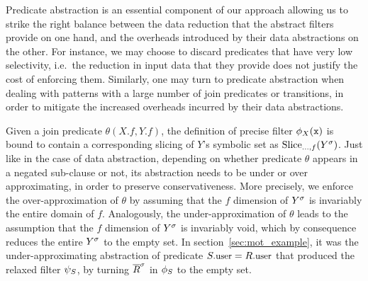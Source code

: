 Predicate abstraction is an essential component of our approach
allowing us to strike the right balance between the data reduction that the
abstract filters provide on one hand, and the overheads introduced by their
data abstractions on the other.
For instance, we may choose to discard
predicates that have very low selectivity, i.e.\ the reduction in input 
data
that they provide does not justify the cost of enforcing them.
Similarly, one may turn to predicate abstraction when dealing with patterns
 with
a large number of join predicates or transitions, in order to mitigate the
increased overheads incurred by their data abstractions.


Given a join predicate $\theta(X.f, Y.f)$, the definition of precise filter 
$\precs{X}(\symv{x})$ is bound to contain a corresponding slicing of $Y$'s 
symbolic set as $\slice{\syms{Y}}{...,f}$. 
Just like in the case of data abstraction, depending on whether predicate 
$\theta$ appears in a negated sub-clause or not, its abstraction needs to be 
under or over approximating, in order to preserve conservativeness.
More precisely, we enforce the over-approximation of $\theta$ by assuming that 
the $f$ dimension of $\syms{Y}$ is invariably the entire domain of $f$.
Analogously, the under-approximation of $\theta$ leads to the assumption that 
the $f$ dimension of $\syms{Y}$ is invariably void, which by consequence 
reduces the entire $\syms{Y}$ to the empty set.
In section~\ref{sec:mot_example}, it was the under-approximating abstraction of 
predicate $\facc{S}{user} = \facc{R}{user}$ that produced the relaxed filter
$\PrecedesPPP$, by turning $\syms{\oR}$ in $\PrecedesP$ to the empty set.  
 
